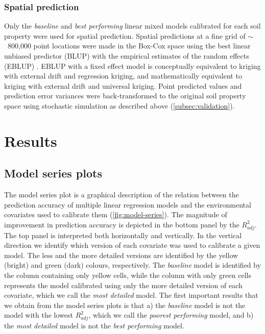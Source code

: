 \subsubsection*{Spatial prediction}
\label{subsec:prediction}

Only the \textit{baseline} and \textit{best performing} linear mixed models 
calibrated for each soil property were used for spatial prediction. Spatial 
predictions at a fine grid of $\sim$~800,000 point locations were made in the 
Box-Cox space using the best linear unbiased predictor (BLUP) with the 
empirical estimates of the random effects (EBLUP) \citep{LarkEtAl2006}. EBLUP 
with a fixed effect model is conceptually equivalent to kriging with external 
drift and regression kriging, and mathematically equivalent to kriging with 
external drift and universal kriging. Point predicted values and prediction 
error variances were back-transformed to the original soil property space using
stochastic simulation as described above (\autoref{subsec:validation}).

\section{Results}
\label{sec:results}

\subsection{Model series plots}

The model series plot is a graphical description of the relation between the 
prediction accuracy of multiple linear regression models and the environmental 
covariates used to calibrate them (\autoref{fig:model-series}). The magnitude 
of improvement in prediction accuracy is depicted in the bottom panel by the 
${R}^{2}_{adj}$. The top panel is interpreted both horizontally and vertically.
In the vertical direction we identify which version of each covariate was used 
to calibrate a given model. The less and the more detailed versions are 
identified by the yellow (bright) and green (dark) colours, respectively. The 
\textit{baseline} model is identified by the column containing only yellow 
cells, while the column with only green cells represents the model calibrated 
using only the more detailed version of each covariate, which we call the 
\textit{most detailed} model. The first important results that we obtain from 
the model series plots is that a) the \textit{baseline} model is not the model
with the lowest ${R}^{2}_{adj}$, which we call the \textit{poorest performing} 
model, and b) the \textit{most detailed} model is not the \textit{best 
performing} model.

